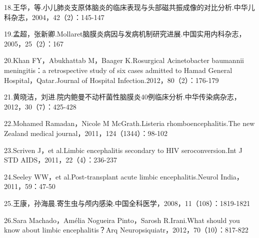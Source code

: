 18.王华，等.小儿肺炎支原体脑炎的临床表现与头部磁共振成像的对比分析.中华儿科杂志，2004，42（2）：145-147

19.孟超，张新卿.Mollaret脑膜炎病因与发病机制研究进展.中国实用内科杂志，2005，25（2）：167

20.Khan FY，Abukhattab M，Baager K.Rosurgical Acinetobacter baumannii
meningitis：a retrospective study of six cases admitted to Hamad General
Hospital，Qatar.Journal of Hospital Infection.2012，80（2）：176-179

21.黄晓洁，刘进.院内鲍曼不动杆菌性脑膜炎40例临床分析.中华传染病杂志，2012，30（7）：425-428

22.Mohamed Ramadan，Nicole M McGrath.Listeria rhomboencephalitis.The new
Zealand medical journal，2011，124（1344）：98-102

23.Scriven J，et al.Limbic encephalitis secondary to HIV
seroconversion.Int J STD AIDS，2011，22（4）：236-237

24.Seeley WW，et al.Post-transplant acute limbic encephalitis.Neurol
India，2011，59：47-50

25.王康，孙海晨.寄生虫与颅内感染.中国全科医学，2008，11（108）：1819-1821

26.Sara Machado，Amélia Nogueira Pinto，Sarosh R.Irani.What should you
know about limbic encephalitis？Arq
Neuropsiquiatr，2012，70（10）：817-822

\protect\hypertarget{text00394.html}{}{}

